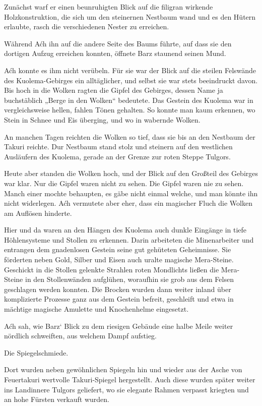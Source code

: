Zunächst warf er einen beunruhigten Blick auf die filigran wirkende Holzkonstruktion, die sich um den steinernen Nestbaum wand und es den Hütern erlaubte, rasch die verschiedenen Nester zu erreichen.

Während Aćh ihn auf die andere Seite des Baums führte, auf dass sie den dortigen Aufzug erreichen konnten, öffnete Barz staunend seinen Mund.

Aćh konnte es ihm nicht verübeln. Für sie war der Blick auf die steilen Felswände des Kuolema-Gebirges ein alltäglicher, und selbst sie war stets beeindruckt davon. Bis hoch in die Wolken ragten die Gipfel des Gebirges, dessen Name ja buchstäblich „Berge in den Wolken“ bedeutete. Das Gestein des Kuolema war in vergleichsweise hellen, fahlen Tönen gehalten. So konnte man kaum erkennen, wo Stein in Schnee und Eis überging, und wo in wabernde Wolken.

An manchen Tagen reichten die Wolken so tief, dass sie bis an den Nestbaum der Takuri reichte. Dur Nestbaum stand stolz und steinern auf den westlichen Ausläufern des Kuolema, gerade an der Grenze zur roten Steppe Tulgors.

Heute aber standen die Wolken hoch, und der Blick auf den Großteil des Gebirges war klar. Nur die Gipfel waren nicht zu sehen. Die Gipfel waren nie zu sehen. Manch einer mochte behaupten, es gäbe nicht einmal welche, und man könnte ihn nicht widerlegen. Aćh vermutete aber eher, dass ein magischer Fluch die Wolken am Auflösen hinderte.

Hier und da waren an den Hängen des Kuolema auch dunkle Eingänge in tiefe Höhlensysteme und Stollen zu erkennen. Darin arbeiteten die Minenarbeiter und entrangen dem gnadenlosen Gestein seine gut gehüteten Geheimnisse. Sie förderten neben Gold, Silber und Eisen auch uralte magische Mera-Steine. Geschickt in die Stollen gelenkte Strahlen roten Mondlichts ließen die Mera-Steine in den Stollenwänden aufglühen, woraufhin sie grob aus dem Felsen geschlagen werden konnten. Die Brocken wurden dann weiter inland über komplizierte Prozesse ganz aus dem Gestein befreit, geschleift und etwa in mächtige magische Amulette und Knochenhelme eingesetzt.

Aćh sah, wie Barz‘ Blick zu dem riesigen Gebäude eine halbe Meile weiter nördlich schweiften, aus welchem Dampf aufstieg.

Die Spiegelschmiede.

Dort wurden neben gewöhnlichen Spiegeln hin und wieder aus der Asche von Feuertakuri wertvolle Takuri-Spiegel hergestellt. Auch diese wurden später weiter ins Landinnere Tulgors geliefert, wo sie elegante Rahmen verpasst kriegten und an hohe Fürsten verkauft wurden.

